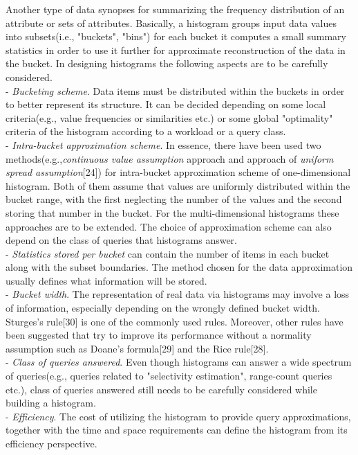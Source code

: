 \documentclass[10pt, conference, compsocconf]{IEEEtran}
\begin{document}
Another type of data synopses for summarizing the frequency distribution of an attribute or sets of attributes. Basically, a histogram groups input data values into subsets(i.e., "buckets", "bins") for each bucket it computes a small summary statistics in order to use it further for approximate reconstruction of the data in the bucket. In designing histograms the following aspects are to be carefully considered.  \\
- \textit{Bucketing scheme}. Data items must be distributed within the buckets in order to better represent its structure. It can be decided depending on some local criteria(e.g., value frequencies or similarities etc.) or some global "optimality" criteria of the histogram according to a workload or a query class.\\
- \textit{Intra-bucket approximation scheme}. In essence, there have been used two methods(e.g.,\textit{continuous value assumption} approach and  approach of \textit{uniform spread assumption}[24]) for intra-bucket approximation scheme of one-dimensional histogram. Both of them assume that values are uniformly distributed within the bucket range, with the first neglecting the number of the values and the second storing that number in the bucket. For the multi-dimensional histograms these approaches are to be extended. The choice of approximation scheme can also depend on the class of queries that histograms answer.\\
- \textit{Statistics stored per bucket} can contain the number of items in each bucket along with the subset boundaries. The method chosen for the data approximation usually defines what information will be stored.\\
- \textit{Bucket width}. The representation of real data via histograms may involve a loss of information, especially depending on the wrongly defined bucket width. Sturges's rule[30] is one of the commonly used rules. Moreover, other rules have been suggested that try to improve its performance without a normality assumption such as Doane's formula[29] and the Rice rule[28].\\ 
- \textit{Class of queries answered}. Even though histograms can answer a wide spectrum of queries(e.g., queries related to "selectivity estimation", range-count queries etc.), class of queries answered still needs to be carefully considered while building a histogram.\\ 
- \textit{Efficiency}. The cost of utilizing the histogram to provide query approximations, together with the time and space requirements can define the histogram from its efficiency perspective.\\
\end{document}
